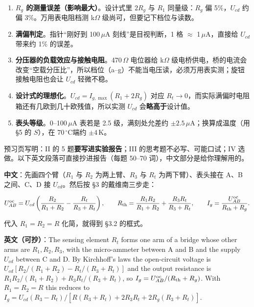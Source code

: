 \documentclass[11pt]{ctexart}
\newcommand{\degC}{\ensuremath{\,^\circ\mathrm{C}}}
\begin{document}

\begin{enumerate}
\item \textbf{$R_g$ 的测量误差（影响最大）}。设计式里 $2R_g$ 与 $R_1$ 同量级：$R_g$ 偏 5\%，$U_{cd}$ 约偏 3\%。万用表电阻档测 k$\Omega$ 级尚可，但要记下档位与读数。
\item \textbf{满偏判定}。指针“刚好到 100\,$\mu$A 刻线”是目视判断，1 格 $\approx$ 1\,$\mu$A，直接给 $U_{cd}$ 带来约 1\% 的误差。
\item \textbf{分压器的负载效应与接触电阻}。470\,$\Omega$ 电位器给 k$\Omega$ 级电桥供电，桥的电流会改变“空载分压比”，所以档位（a--g）不能当电压读，必须万用表实测；旋钮接触电阻也会让 $U_{cd}$ 轻微不稳。
\item \textbf{设计式的理想化}。$U_{cd}=I_{g,\max}(R_1+2R_g)$ 对应 $R_t\to0$，而实际满偏时电阻箱还有几欧到几十欧残值，所以实测 $U_{cd}$ 会\textbf{略高于}设计值。
\item \textbf{表头等级}。0--100\,$\mu$A 表若是 2.5 级，满刻处允差约 $\pm2.5\,\mu$A；换算成温度（用 §5 的 $S$），在 70\degC 端约 $\pm4$\,K。
\end{enumerate}



预习页写明：II 的 5 题\textbf{要写进实验报告}；III 的思考题不必写、可能口试；IV 选做。以下英文段落可直接抄进报告（每题 50--70 词），中文部分是给你理解用的。


\textbf{中文}：先画四个臂（$R_1$ 与 $R_2$ 为两上臂、$R_3$ 与 $R_t$ 为两下臂）、表头接在 A、B 之间、C、D 接 $U_{cd}$。然后按 §3 的戴维南三步走：

\[
U_{AB}^{\rm oc}=U_{cd}\left(\frac{R_2}{R_1+R_2}-\frac{R_t}{R_3+R_t}\right),
\qquad
R_{\rm th}=\frac{R_1R_2}{R_1+R_2}+\frac{R_3R_t}{R_3+R_t},
\qquad
I_g=\frac{U_{AB}^{\rm oc}}{R_{\rm th}+R_g}.
\]

代入 $R_1=R_2=R$ 化简，就得到 §3.2 的框式。

\textbf{英文（可抄）}：The sensing element $R_t$ forms one arm of a bridge whose other arms are $R_1,R_2,R_3$, with the micro-ammeter between A and B and the supply $U_{cd}$ between C and D. By Kirchhoff's laws the open-circuit voltage is $U_{cd}[R_2/(R_1+R_2)-R_t/(R_3+R_t)]$ and the output resistance is $R_1R_2/(R_1+R_2)+R_3R_t/(R_3+R_t)$, so $I_g=U_{AB}^{\rm oc}/(R_{\rm th}+R_g)$. With $R_1=R_2=R$ this reduces to $I_g=U_{cd}(R_3-R_t)/[R(R_3+R_t)+2R_3R_t+2R_g(R_3+R_t)]$.
\end{document}
